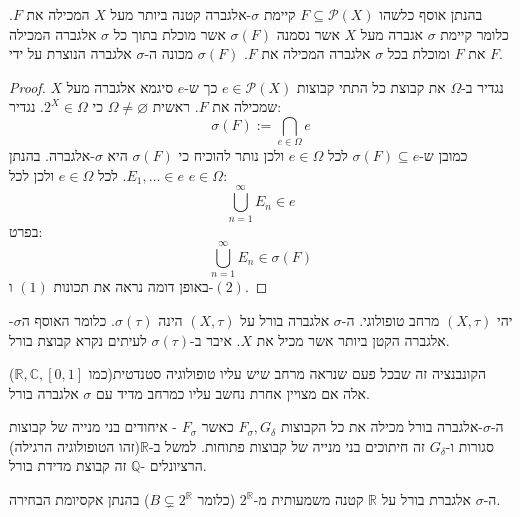 \documentclass{tstextbook}
\begin{document}
\begin{proposition}
בהנתן אוסף כלשהו \(F \subseteq \mathcal{P}(X)\) קיימת \(\sigma\)-אלגברה קטנה ביותר מעל \(X\) המכילה את \(F\). כלומר קיימת \(\sigma\) אגברה מעל \(X\) אשר נסמנה \(\sigma(F)\) אשר מוכלת בתוך כל \(\sigma\) אלגברה המכילה את \(F\) ומוכלת בכל \(\sigma\) אלגברה המכילה את \(F\). \(\sigma(F)\) מכונה ה-\(\sigma\) אלגברה הנוצרת על ידי \(F\).

\end{proposition}
\begin{proof}
נגדיר ב-\(\Omega\) את קבוצת כל התתי קבוצות \(e \in\mathcal{P}(X)\) כך ש-\(e\) סיגמא אלגברה מעל \(X\) שמכילה את \(F\).
ראשית \(\Omega \neq \varnothing\) כי \(2^{X} \in \Omega\). נגדיר:
$$\sigma(F):= \bigcap_{e \in \Omega}e$$
כמובן ש-\(\sigma(F)\subseteq e\) לכל \(e \in \Omega\) ולכן נותר להוכיח כי \(\sigma(F)\) היא \(\sigma\)-אלגברה. בהנתן \(E_{1},\dots \in e\).
לכל \(e \in \Omega\) ולכן לכל \(e \in \Omega\):
$$\bigcup_{n=1}^{\infty}E_{n}\in e$$
בפרט:
$$\bigcup_{n=1}^{\infty}E_{n}\in \sigma(F)$$
באופן דומה נראה את תכונות \((1)\) ו-\((2)\).

\end{proof}
\begin{definition}
יהי \(\left( X,\tau \right)\) מרחב טופולוגי. ה-\(\sigma\) אלגברה בורל על \(\left( X,\tau \right)\) הינה \(\sigma\left( \tau \right)\). כלומר האוסף ה\(\sigma\)-אלגברה הקטן ביותר אשר מכיל את \(X\). איבר ב-\(\sigma\left( \tau \right)\) לעיתים נקרא קבוצת בורל.

\end{definition}
\begin{remark}
הקונבנציה זה שבכל פעם שנראה מרחב שיש עליו טופולוגיה סטנדטית(כמו \(\mathbb{R},\mathbb{C},[0,1]\)) אלה אם מצויין אחרת נחשב עליו כמרחב מדיד עם \(\sigma\) אלגברה בורל.

\end{remark}
\begin{remark}
ה-\(\sigma\)-אלגברה בורל מכילה את כל הקבוצות \(F_{\sigma},G_{\delta}\) כאשר \(F_{\sigma}\) - איחודים בני מנייה של קבוצות סגורות ו-\(G_{\delta}\) זה חיתוכים בני מנייה של קבוצות פתוחות. למשל ב-\(\mathbb{R}\)(זהו הטופולוגיה הרגילה) הרציונלים -\(\mathbb{Q}\) זה קבוצת מדידת בורל.

\end{remark}
\begin{remark}
ה-\(\sigma\) אלגברת בורל על \(\mathbb{R}\) קטנה משמעותית מ-\(2^{\mathbb{R}}\) (כלומר \(B\subsetneq 2^{\mathbb{R}}\)) בהנתן אקסיומת הבחירה.

\end{remark}
\end{document}
